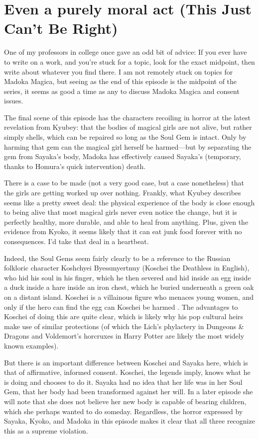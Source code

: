 \chapter{Even a purely moral act (This Just Can't Be Right)}
One of my professors in college once gave an odd bit of advice: If you ever have to write on a work, and you're stuck for a topic, look for the exact midpoint, then write about whatever you find there. I am not remotely stuck on topics for Madoka Magica, but seeing as the end of this episode is the midpoint of the series, it seems as good a time as any to discuss Madoka Magica and consent issues.

The final scene of this episode has the characters recoiling in horror at the latest revelation from Kyubey: that the bodies of magical girls are not alive, but rather simply shells, which can be repaired so long as the Soul Gem is intact. Only by harming that gem can the magical girl herself be harmed—but by separating the gem from Sayaka's body, Madoka has effectively caused Sayaka's (temporary, thanks to Homura's quick intervention) death.

There is a case to be made (not a very good case, but a case nonetheless) that the girls are getting worked up over nothing. Frankly, what Kyubey describes seems like a pretty sweet deal: the physical experience of the body is close enough to being alive that most magical girls never even notice the change, but it is perfectly healthy, more durable, and able to heal from anything. Plus, given the evidence from Kyoko, it seems likely that it can eat junk food forever with no consequences. I'd take that deal in a heartbeat.

Indeed, the Soul Gems seem fairly clearly to be a reference to the Russian folkloric character Koshchyei Byessmyertnuy (Koschei the Deathless in English), who hid his soul in his finger, which he then severed and hid inside an egg inside a duck inside a hare inside an iron chest, which he buried underneath a green oak on a distant island. Koschei is a villainous figure who menaces young women, and only if the hero can find the egg can Koschei be harmed \cite{ref44}. The advantages to Koschei of doing this are quite clear, which is likely why his pop cultural heirs make use of similar protections (of which the Lich's phylactery in Dungeons \& Dragons \cite{ref45} and Voldemort's horcruxes in Harry Potter \cite{ref46} are likely the most widely known examples).

But there is an important difference between Koschei and Sayaka here, which is that of affirmative, informed consent. Koschei, the legends imply, knows what he is doing and chooses to do it. Sayaka had no idea that her life was in her Soul Gem, that her body had been transformed against her will. In a later episode she will note that she does not believe her new body is capable of bearing children, which she perhaps wanted to do someday. Regardless, the horror expressed by Sayaka, Kyoko, and Madoka in this episode makes it clear that all three recognize this as a supreme violation.

